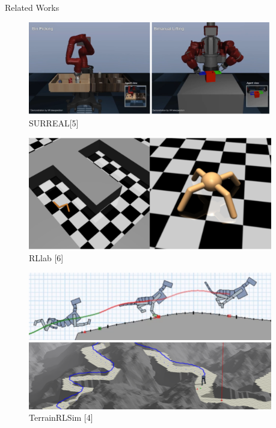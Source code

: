 \documentclass[final]{beamer}
\newlength{\sepwid}
\newlength{\onecolwid}
\begin{document}
\begin{frame}[t]
\begin{columns}[t]
\begin{column}{\onecolwid}
\begin{block}{Related Works}

\end{block}

\begin{figure}
	\includegraphics[width=0.8\linewidth]{_imgs/img_related_works_surreal.png}
	\caption{SURREAL[5]}
\end{figure}

\begin{figure}
    \includegraphics[width=0.8\linewidth]{_imgs/img_related_works_rllab.png}
    \caption{RLlab [6]}
\end{figure}

\begin{figure}
	\includegraphics[width=0.8\linewidth,height=0.3\linewidth]{_imgs/img_related_works_terrainrlsim.png}
	\caption{TerrainRLSim [4]}
\end{figure}


\end{column} %
\begin{column}{\sepwid}\end{column} %


\end{columns}
\end{frame}
\end{document}
